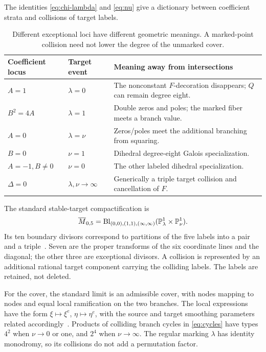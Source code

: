 The identities \eqref{eq:chi-lambda} and \eqref{eq:nu} give a dictionary between coefficient strata and collisions of target labels.
\begin{table}[htbp]\centering\small
\begin{tabularx}{\linewidth}{L{28mm}L{27mm}Y}\toprule
Coefficient locus & Target event & Meaning away from intersections\\\midrule
\(A=1\) & \(\lambda=0\) & The nonconstant \(F\)-decoration disappears; \(Q\) can remain degree eight.\\
\(B^2=4A\) & \(\lambda=1\) & Double zeros and poles; the marked fiber meets a branch value.\\
\(A=0\) & \(\lambda=\nu\) & Zeros/poles meet the additional branching from squaring.\\
\(B=0\) & \(\nu=1\) & Dihedral degree-eight Galois specialization.\\
\(A=-1, B\ne0\) & \(\nu=0\) & The other labeled dihedral specialization.\\
\(\Delta=0\) & \(\lambda,\nu\to\infty\) & Generically a triple target collision and cancellation of \(F\).\\\bottomrule
\end{tabularx}\caption{Different exceptional loci have different geometric meanings. A marked-point collision need not lower the degree of the unmarked cover.}\label{tab:boundaries}
\end{table}

The standard stable-target compactification is
\begin{equation}\label{eq:barM}
\overline M_{0,5}=\operatorname{Bl}_{(0,0),(1,1),(\infty,\infty)}
(\mathbb P^1_\lambda\times\mathbb P^1_\nu).
\end{equation}
Its ten boundary divisors correspond to partitions of the five labels into a pair and a triple~\cite[\S2]{Braungardt}. Seven are the proper transforms of the six coordinate lines and the diagonal; the other three are exceptional divisors. A collision is represented by an additional rational target component carrying the colliding labels. The labels are retained, not deleted.

For the cover, the standard limit is an admissible cover, with nodes mapping to nodes and equal local ramification on the two branches. The local expressions have the form \(\xi\mapsto\xi^e\), \(\eta\mapsto\eta^e\), with the source and target smoothing parameters related accordingly~\cite[Definition 8; \S5.1]{CMR}. Products of colliding branch cycles in \eqref{eq:cycles} have types \(4^2\) when \(\nu\to0\) or one, and \(2^4\) when \(\nu\to\infty\). The regular marking \(\lambda\) has identity monodromy, so its collisions do not add a permutation factor.

